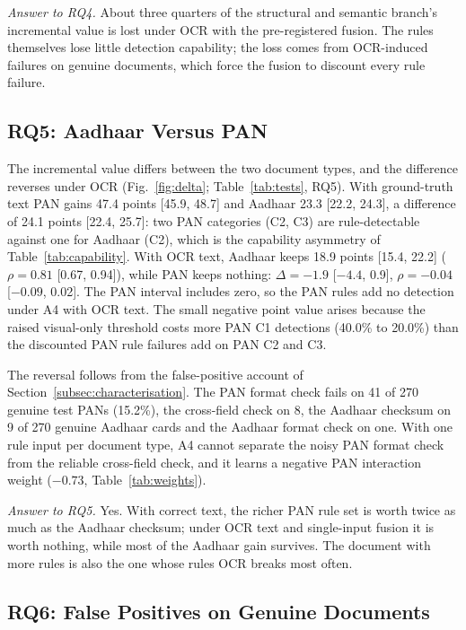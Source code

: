 \documentclass[conference]{IEEEtran}
\begin{document}


\emph{Answer to RQ4.} About three quarters of the structural and
semantic branch's incremental value is lost under OCR with the
pre-registered fusion. The rules themselves lose little detection
capability; the loss comes from OCR-induced failures on genuine
documents, which force the fusion to discount every rule failure.

\subsection{RQ5: Aadhaar Versus PAN}
\label{subsec:res-rq5}



The incremental value differs between the two document types, and the
difference reverses under OCR (Fig.~\ref{fig:delta};
Table~\ref{tab:tests}, RQ5). With ground-truth text PAN gains 47.4
points [45.9, 48.7] and Aadhaar 23.3 [22.2, 24.3], a difference of 24.1
points [22.4, 25.7]: two PAN categories (C2, C3) are rule-detectable
against one for Aadhaar (C2), which is the capability asymmetry of
Table~\ref{tab:capability}. With OCR text, Aadhaar keeps 18.9 points
[15.4, 22.2] ($\rho=0.81$ [0.67, 0.94]), while PAN keeps nothing:
$\Delta=-1.9$ [$-4.4$, 0.9], $\rho=-0.04$ [$-0.09$, 0.02]. The PAN
interval includes zero, so the PAN rules add no detection under A4 with
OCR text. The small negative point value arises because the raised
visual-only threshold costs more PAN C1 detections (40.0\% to 20.0\%)
than the discounted PAN rule failures add on PAN C2 and C3.

The reversal follows from the false-positive account of
Section~\ref{subsec:characterisation}. The PAN format check fails on
41 of 270 genuine test PANs (15.2\%), the cross-field check on 8, the
Aadhaar checksum on 9 of 270 genuine Aadhaar cards and the Aadhaar
format check on one. With one rule input per document type, A4 cannot
separate the noisy PAN format check from the reliable cross-field
check, and it learns a negative PAN interaction weight ($-0.73$,
Table~\ref{tab:weights}).

\emph{Answer to RQ5.} Yes. With correct text, the richer PAN rule set
is worth twice as much as the Aadhaar checksum; under OCR text and
single-input fusion it is worth nothing, while most of the Aadhaar
gain survives. The document with more rules is also the one whose rules
OCR breaks most often.

\subsection{RQ6: False Positives on Genuine Documents}
\label{subsec:res-rq6}
\end{document}

